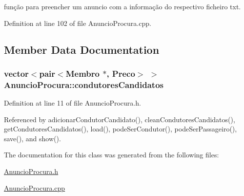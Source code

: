 função para preencher um anuncio com a informação do respectivo ficheiro txt. 



Definition at line 102 of file Anuncio\+Procura.\+cpp.



\subsection{Member Data Documentation}
\hypertarget{class_anuncio_procura_a3e08d3fe714ffbff0434f5e3675a7601}{
\subsubsection[{condutores\+Candidatos}]{\setlength{\rightskip}{0pt plus 5cm}vector$<$pair$<${\bf Membro} $\ast$, {\bf Preco}$>$ $>$ Anuncio\+Procura\+::condutores\+Candidatos\hspace{0.3cm}{\ttfamily [private]}}}\label{class_anuncio_procura_a3e08d3fe714ffbff0434f5e3675a7601}


Definition at line 11 of file Anuncio\+Procura.\+h.



Referenced by adicionar\+Condutor\+Candidato(), clean\+Condutores\+Candidatos(), get\+Condutores\+Candidatos(), load(), pode\+Ser\+Condutor(), pode\+Ser\+Passageiro(), save(), and show().



The documentation for this class was generated from the following files\+:\begin{DoxyCompactItemize}
\item 
\hyperlink{_anuncio_procura_8h}{Anuncio\+Procura.\+h}\item 
\hyperlink{_anuncio_procura_8cpp}{Anuncio\+Procura.\+cpp}\end{DoxyCompactItemize}
